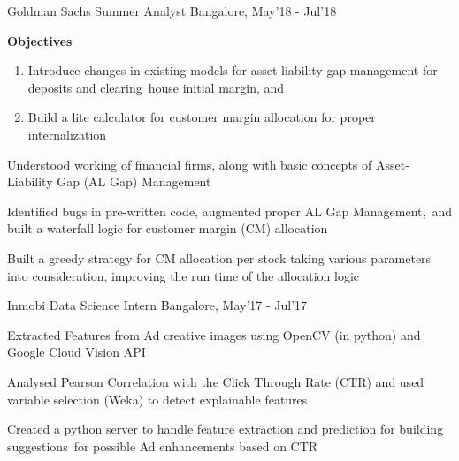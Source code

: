 
\begin{cventries}

	\cventry
	{Goldman Sachs}
	{Summer Analyst}
	{Bangalore, May'18 - Jul'18}
	{}
	{}
	{
		\vspace{-4mm}
		\begin{addmargin}{1em}
			\textbf{Objectives}
			\begin{enumerate}[label=(\roman*)]
				\item Introduce changes in existing models for asset liability gap management for deposits and clearing house initial margin, and
				\item Build a lite calculator for customer margin allocation for proper internalization 
			\end{enumerate}
		\end{addmargin}
		\vspace{4.5mm}
		\begin{cvitems}
		\item Understood working of financial firms, along with basic concepts of Asset-Liability Gap (AL Gap) Management
		\item Identified bugs in pre-written code, augmented proper AL Gap Management, and built a waterfall logic for customer margin (CM) allocation
		\item Built a greedy strategy for CM allocation per stock taking various parameters into consideration, improving the run time of the allocation logic
		\end{cvitems}
	}

	\cventry
	{Inmobi}
	{Data Science Intern}
	{Bangalore, May'17 - Jul'17}
	{}
	{}
	{
		\begin{cvitems}
		\item Extracted Features from Ad creative images using OpenCV (in python) and Google Cloud Vision API
		\item Analysed Pearson Correlation with the Click Through Rate (CTR) and used variable selection (Weka) to detect explainable features 
		\item Created a python server to handle feature extraction and prediction for building suggestions for possible Ad enhancements based on CTR
		\end{cvitems}
	}


\end{cventries}
